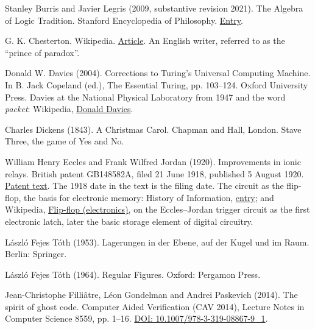 \documentclass[11pt,twoside]{article}
\theoremstyle{thielethm}
\theoremstyle{thieledef}
\theoremstyle{thieledef}
\theoremstyle{thieledef}
\theoremstyle{thielethm}
\theoremstyle{thieleobs}
\theoremstyle{thielethm}
\begin{document}
\noindent Stanley Burris and Javier Legris (2009, substantive revision 2021). The Algebra of Logic Tradition. Stanford Encyclopedia of Philosophy. \href{https://plato.stanford.edu/entries/algebra-logic-tradition/}{Entry}.
\par\medskip

\noindent G. K. Chesterton. Wikipedia. \href{https://en.wikipedia.org/wiki/G._K._Chesterton}{Article}. An English writer, referred to as the ``prince of paradox''.
\par\medskip

\noindent Donald W. Davies (2004). Corrections to Turing's Universal Computing Machine. In B. Jack Copeland (ed.), The Essential Turing, pp. 103--124. Oxford University Press. Davies at the National Physical Laboratory from 1947 and the word \emph{packet}: Wikipedia, \href{https://en.wikipedia.org/wiki/Donald_Davies}{Donald Davies}.
\par\medskip

\noindent Charles Dickens (1843). A Christmas Carol. Chapman and Hall, London. Stave Three, the game of Yes and No.
\par\medskip

\noindent William Henry Eccles and Frank Wilfred Jordan (1920). Improvements in ionic relays. British patent GB148582A, filed 21 June 1918, published 5 August 1920. \href{https://patents.google.com/patent/GB148582A/en}{Patent text}. The 1918 date in the text is the filing date. The circuit as the flip-flop, the basis for electronic memory: History of Information, \href{https://www.historyofinformation.com/detail.php?id=3606}{entry}; and Wikipedia, \href{https://en.wikipedia.org/wiki/Flip-flop_(electronics)}{Flip-flop (electronics)}, on the Eccles--Jordan trigger circuit as the first electronic latch, later the basic storage element of digital circuitry.
\par\medskip

\noindent László Fejes Tóth (1953). Lagerungen in der Ebene, auf der Kugel und im Raum. Berlin: Springer.
\par\medskip

\noindent László Fejes Tóth (1964). Regular Figures. Oxford: Pergamon Press.
\par\medskip

\noindent Jean-Christophe Filliâtre, Léon Gondelman and Andrei Paskevich (2014). The spirit of ghost code. Computer Aided Verification (CAV 2014), Lecture Notes in Computer Science 8559, pp. 1--16. \href{https://doi.org/10.1007/978-3-319-08867-9_1}{DOI: 10.1007/978-3-319-08867-9\_1}.
\par\medskip
\end{document}
